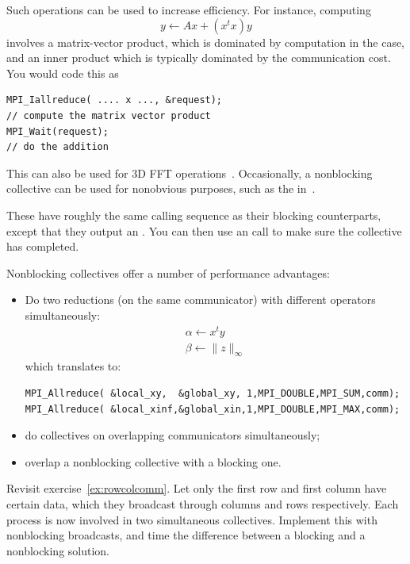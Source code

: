 Such operations can be used to increase efficiency.
For instance, computing
\[ y \leftarrow Ax + (x^tx)y \]
involves a matrix-vector product, which is dominated by computation
in the  case, and an inner product which is 
typically dominated by the communication cost. You would code this as
\begin{lstlisting}
MPI_Iallreduce( .... x ..., &request);
// compute the matrix vector product
MPI_Wait(request);
// do the addition
\end{lstlisting}

This can also be used for 3D FFT operations~\cite{Hoefler:case-for-nbc}.
Occasionally, a nonblocking collective can be used for nonobvious purposes,
such as the  in~\cite{Hoefler:2010:SCP}.

These have roughly the same calling sequence as their blocking counterparts,
except that they output an . You
can then use an  call to make sure the collective
has completed.

Nonblocking collectives offer a number of performance advantages:
\begin{itemize}
\item Do two reductions (on the same communicator) with different
  operators simultaneously:
\[ 
\begin{array}{l}
  \alpha\leftarrow x^ty\\
  \beta\leftarrow \|z\|_\infty
\end{array}
\]
which translates to:
\begin{lstlisting}
MPI_Allreduce( &local_xy,  &global_xy, 1,MPI_DOUBLE,MPI_SUM,comm);
MPI_Allreduce( &local_xinf,&global_xin,1,MPI_DOUBLE,MPI_MAX,comm);
\end{lstlisting}
\item do collectives on overlapping communicators simultaneously;
\item overlap a nonblocking collective with a blocking one.
\end{itemize}

\begin{exercise}
  \label{ex:procgridnonblock}
  Revisit exercise~\ref{ex:rowcolcomm}. Let only the first row and
  first column have certain data, which they broadcast through columns
  and rows respectively. Each process is now involved in two
  simultaneous collectives. Implement this with nonblocking
  broadcasts, and time the difference between a blocking and a
  nonblocking solution.
\end{exercise}

